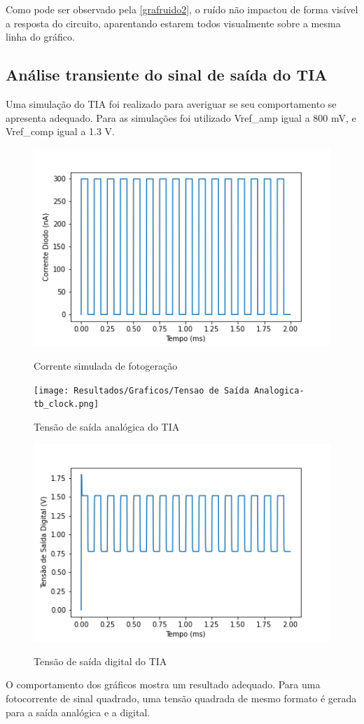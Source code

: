 Como pode ser observado pela \autoref{grafruido2}, o ruído não impactou de forma visível a resposta do circuito, aparentando estarem todos visualmente sobre a mesma linha do gráfico.

\subsection{Análise transiente do sinal de saída do TIA}
\label{DCAPS}

Uma simulação do TIA foi realizado para averiguar se seu comportamento se apresenta adequado. Para as simulações foi utilizado Vref\_amp igual a 800 mV, e Vref\_comp igual a 1.3 V.

\begin{figure}[htb]
 \centering
    \caption{Corrente simulada de fotogeração} 
    \includegraphics[scale=0.5]{Resultados/Graficos/Corrente Diodo-tb_clock.png}
    \label{graf_tiasinal}
\end{figure}

\begin{figure}[htb]
 \centering
    \caption{Tensão de saída analógica do TIA} 
    \texttt{[image: Resultados/Graficos/Tensao de Saída Analogica-tb\_clock.png]}
    \label{graf_tiasinal2}
\end{figure}

\begin{figure}[htb]
 \centering
    \caption{Tensão de saída digital do TIA} 
    \includegraphics[scale=0.5]{Resultados/Graficos/Tensao de Saida Digital-tb_clock.png}
    \label{graf_tiasinal3}
\end{figure}

O comportamento dos gráficos mostra um resultado adequado. Para uma fotocorrente de sinal quadrado, uma tensão quadrada de mesmo formato é gerada para a saída analógica e a digital.

